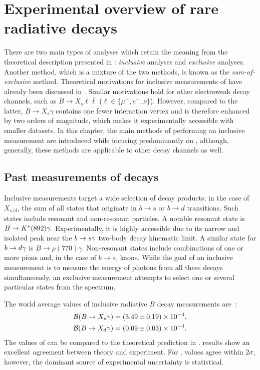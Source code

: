 \chapter{Experimental overview of rare radiative decays}\label{ch:exp_overview}

There are two main types of analyses which retain the meaning 
from the theoretical description presented in : \textit{inclusive} analyses and \textit{exclusive} analyses.
Another method, which is a mixture of the two methods, is known as the \textit{sum-of-exclusive} method.
Theoretical motivations for inclusive measurements of \BtoXsgamma have already been discussed in .
Similar motivations hold for other electroweak decay channels, such as $B\to X_s\ell\bar{\ell}$ ($\ell\in\{\mu^-,e^-,\nu\}$).
However, compared to the latter, $B\rightarrow X_s\gamma$ contains one fewer interaction vertex and is therefore enhanced by two orders of magnitude, which makes it experimentally accessible with smaller datasets.
In this chapter, the main methods of performing an inclusive measurement are introduced while focusing predominantly on \BtoXsdgamma, although, generally, these methods are applicable to other decay channels as well.

\section{Past measurements of \safeBtoXsdgamma decays}

Inclusive measurements target a wide selection of decay products; in the case of $X_{s/d}$, the sum of all states that originate in $b\to s$ or $b\to d$ transitions.
Such states include resonant and non-resonant particles.
A notable resonant state is $B\rightarrow K^*(892)\gamma$.
Experimentally, it is highly accessible due to its narrow and isolated peak near the $b\rightarrow s\gamma$ two-body decay kinematic limit.
A similar state for $b\rightarrow d\gamma$ is $B\rightarrow \rho(770)\gamma$.
Non-resonant states include combinations of one or more pions and, in the case of $b\rightarrow s$, kaons.
While the goal of an inclusive measurement is to measure the energy of photons from all these decays simultaneously, an exclusive measurement attempts to select one or several particular states from the spectrum.

The world average values of inclusive radiative $B$ decay measurements are~\cite{Amhis:2022mac,Workman:2022ynf}:
\begin{align}\label{eq:btosgamma_experimental}
    \begin{split}
    \mathcal{B}(\BtoXsgamma)&=(3.49\pm 0.19)\times10^{-4},\\
    \mathcal{B}(\BtoXdgamma)&=(0.09\pm 0.03)\times10^{-4}.
    \end{split}
\end{align}
The values of  can be compared to the theoretical prediction in .
\BtoXsgamma results show an excellent agreement between theory and experiment.
For \BtoXdgamma, values agree within $2\sigma$, however, the dominant source of experimental uncertainty is statistical. 

